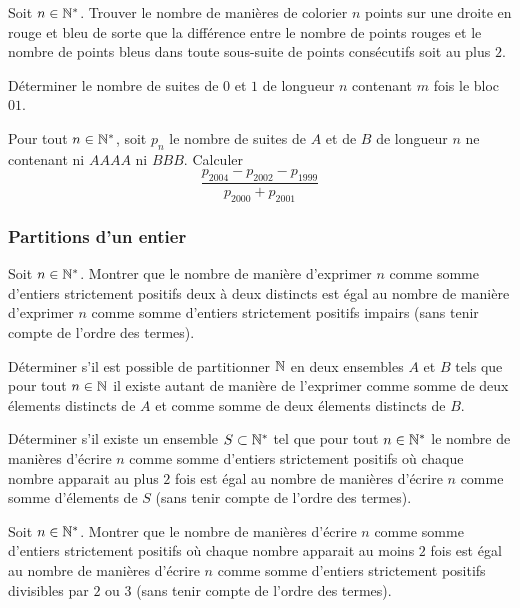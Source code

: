 \begin{exo}
Soit $n\in\mathbb N^*$. Trouver le nombre de manières de colorier $n$ points sur une droite en rouge et bleu de sorte que la différence entre le nombre de points rouges et le nombre de points bleus dans toute sous-suite de points consécutifs soit au plus $2$.
\end{exo}


\begin{exo}
Déterminer le nombre de suites de $0$ et $1$ de longueur $n$ contenant $m$ fois le bloc $01$.
\end{exo}


\begin{exo}
Pour tout $n\in\mathbb N^*$, soit $p_n$ le nombre de suites de $A$ et de $B$ de longueur $n$ ne contenant ni $AAAA$ ni $BBB$. Calculer
$$\frac{p_{2004}-p_{2002}-p_{1999}}{p_{2000}+p_{2001}}$$
\end{exo}


\subsubsection{Partitions d'un entier}


\begin{exo}
Soit $n\in\mathbb N^*$. Montrer que le nombre de manière d'exprimer $n$ comme somme d'entiers strictement positifs deux à deux distincts est égal au nombre de manière d'exprimer $n$ comme somme d'entiers strictement positifs impairs (sans tenir compte de l'ordre des termes).
\end{exo}


\begin{exo}
Déterminer s'il est possible de partitionner $\mathbb N$ en deux ensembles $A$ et $B$ tels que pour tout $n\in\mathbb N$ il existe autant de manière de l'exprimer comme somme de deux élements distincts de $A$ et comme somme de deux élements distincts de $B$.
\end{exo}


\begin{exo}
Déterminer s'il existe un ensemble $S\subset\mathbb N^*$ tel que pour tout $n\in\mathbb N^*$ le nombre de manières d'écrire $n$ comme somme d'entiers strictement positifs où chaque nombre apparait au plus $2$ fois est égal au nombre de manières d'écrire $n$ comme somme d'élements de $S$ (sans tenir compte de l'ordre des termes).
\end{exo}


\begin{exo}
Soit $n\in\mathbb N^*$. Montrer que le nombre de manières d'écrire $n$ comme somme d'entiers strictement positifs où chaque nombre apparait au moins $2$ fois est égal au nombre de manières d'écrire $n$ comme somme d'entiers strictement positifs divisibles par $2$ ou $3$ (sans tenir compte de l'ordre des termes).
\end{exo}


